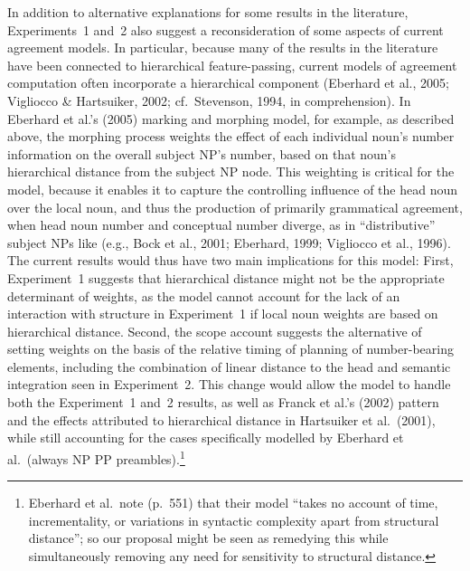 \documentclass[12pt,titlepage]{article}
\newcommand{\IGNORE}[1]{} %
\begin{document}
\IGNORE{\subsection{Reconsidering Hierarchical Feature-Passing in the 
Marking \& Morphing Model}}

\IGNORE{---adjust M\&M model; w depends on planning distance, which depends
on planning time, based on linear order and semint (and maybe other stuff)}

In addition to alternative explanations for some results in the literature,
Experiments~1 and~2 also suggest a reconsideration of some aspects of
current agreement models.  In particular, because many of the results in
the literature have been connected to hierarchical feature-passing, current
models of agreement computation often incorporate a hierarchical component
(Eberhard et al., 2005; Vigliocco \& Hartsuiker, 2002; cf.\ Stevenson,
1994, in comprehension).  In Eberhard et al.'s (2005) marking and morphing
model, for example, as described above, the morphing process weights the
effect of each individual noun's number information on the overall subject
NP's number, based on that noun's hierarchical distance from the subject NP
node.  This weighting is critical for the model, because it enables it to
capture the controlling influence of the head noun over the local noun, and
thus the production of primarily grammatical agreement, when head noun
number and conceptual number diverge, as in ``distributive'' subject NPs
like  (e.g., Bock et al., 2001; Eberhard,
1999; Vigliocco et al., 1996).  The current results would thus have two
main implications for this model: First, Experiment~1 suggests that
hierarchical distance might not be the appropriate determinant of weights,
as the model cannot account for the lack of an interaction with structure
in Experiment~1 if local noun weights are based on hierarchical distance.
Second, the scope account suggests the alternative of setting weights on
the basis of the relative timing of planning of number-bearing elements,
including the combination of linear distance to the head and semantic
integration seen in Experiment~2.  This change would allow the model to
handle both the Experiment~1 and~2 results, as well as Franck et al.'s
(2002) pattern and the effects attributed to hierarchical distance in
Hartsuiker et al.\ (2001), while still accounting for the cases
specifically modelled by Eberhard et al.\ (always NP PP
preambles).\footnote{Eberhard et al.\ note (p.~551) that their model
``takes no account of time, incrementality, or variations in syntactic
complexity apart from structural distance''; so our proposal might be seen
as remedying this while simultaneously removing any need for sensitivity to
structural distance.}
\end{document}
